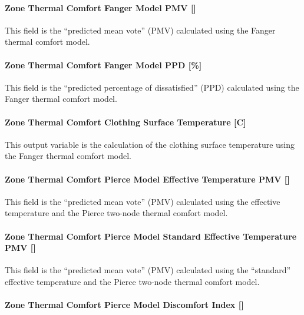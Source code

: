 \paragraph{Zone Thermal Comfort Fanger Model PMV {[]}}\label{zone-thermal-comfort-fanger-model-pmv}

This field is the ``predicted mean vote'' (PMV) calculated using the Fanger thermal comfort model.

\paragraph{Zone Thermal Comfort Fanger Model PPD {[}\%{]}}\label{zone-thermal-comfort-fanger-model-ppd}

This field is the ``predicted percentage of dissatisfied'' (PPD) calculated using the Fanger thermal comfort model.

\paragraph{Zone Thermal Comfort Clothing Surface Temperature {[}C{]}}\label{zone-thermal-comfort-clothing-surface-temperature-c}

This output variable is the calculation of the clothing surface temperature using the Fanger thermal comfort model.

\paragraph{Zone Thermal Comfort Pierce Model Effective Temperature PMV {[]}}\label{zone-thermal-comfort-pierce-model-effective-temperature-pmv}

This field is the ``predicted mean vote'' (PMV) calculated using the effective temperature and the Pierce two-node thermal comfort model.

\paragraph{Zone Thermal Comfort Pierce Model Standard Effective Temperature PMV {[]}}\label{zone-thermal-comfort-pierce-model-standard-effective-temperature-pmv}

This field is the ``predicted mean vote'' (PMV) calculated using the ``standard'' effective temperature and the Pierce two-node thermal comfort model.

\paragraph{Zone Thermal Comfort Pierce Model Discomfort Index {[]}}\label{zone-thermal-comfort-pierce-model-discomfort-index}

